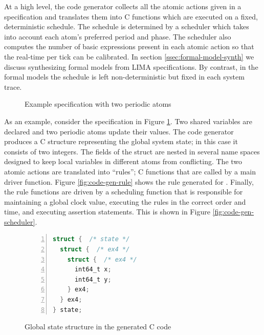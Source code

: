 At a high level, the code generator collects all the atomic actions given in
a specification and translates them into C functions which are executed on a
fixed, deterministic schedule. The schedule is determined by a scheduler which
takes into account each atom's preferred period and phase. The scheduler also
computes the number of basic expressions present in each atomic action so that
the real-time per tick can be calibrated. In section
\ref{ssec:formal-model-synth} we discuss synthesizing formal models from LIMA
specifications. By contrast, in the formal models the schedule is left
non-deterministic but fixed in each system trace.

\begin{figure}
\caption{Example specification with two periodic atoms}
\label{fig:code-gen-example}
\end{figure}

As an example, consider the specification in Figure
\ref{fig:code-gen-example}. Two shared variables are declared and two periodic
atoms update their values. The code generator produces a C structure
representing the global system state; in this case it consists of two
integers. The fields of the struct are nested in several name spaces designed
to keep local variables in different atoms from conflicting. The two atomic
actions are translated into ``rules''; C functions that are called by a main
driver function. Figure \ref{fig:code-gen-rule} shows the rule generated for
. Finally, the rule functions are driven by a scheduling function
that is responsible for maintaining a global clock value, executing the rules
in the correct order and time, and executing assertion statements. This is
shown in Figure \ref{fig:code-gen-scheduler}.

\begin{figure}
    \begin{lstlisting}[language=C,
                       numbers=left,
                       numberstyle=\scriptsize,
                       stepnumber=1,
                       numbersep=8pt,
                       showstringspaces=false,
                       breaklines=true,
                       frame=single]
struct {  /* state */
  struct {  /* ex4 */
    struct {  /* ex4 */
      int64_t x;
      int64_t y;
    } ex4;
  } ex4;
} state;
    \end{lstlisting}
    \caption{Global state structure in the generated C code}
    \label{fig:code-gen-state-struct}
\end{figure}


